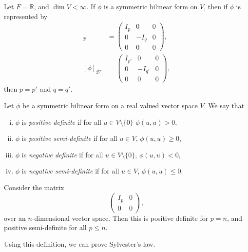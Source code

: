 \documentclass[12pt]{article}
\begin{document}
\begin{theorem}
	Let $F = \mathbb{R}$, and $\dim V < \infty$. If $\phi$ is a symmetric bilinear form on $V$, then if $\phi$ is represented by
	\begin{align*}
		[\phi]_{\mathcal{B}} &= 
		\begin{pmatrix}
			I_p & 0 & 0 \\
			   0 & -I_q & 0 \\
			0 & 0 & 0
		\end{pmatrix}
		, \\
		[\phi]_{\mathcal{B}'} &=
		\begin{pmatrix}
			I_{p'} & 0 & 0 \\
			      0 & -I_{q'} & 0 \\
			0 & 0 & 0
		\end{pmatrix},
	\end{align*}
	then $p = p'$ and $q = q'$.
\end{theorem}

\begin{definition}
	Let $\phi$ be a symmetric bilinear form on a real valued vector space $V$. We say that
	\begin{enumerate}[(i)]
		\item $\phi$ is \textit{positive definite} if for all $u \in V \setminus \{0\}$ $\phi(u, u) > 0$,
		\item $\phi$ is \textit{positive semi-definite} if for all $u \in V$, $\phi(u, u) \geq 0$,
		\item $\phi$ is \textit{negative definite} if for all $u \in V \setminus \{0\}$, $\phi(u, u) < 0$,
		\item $\phi$ is \textit{negative semi-definite} if for all $u \in V$, $\phi(u, u) \leq 0$.
	\end{enumerate}
\end{definition}

\begin{exbox}
	Consider the matrix
	\[
	\begin{pmatrix}
		I_p & 0 \\
		0 & 0
	\end{pmatrix}
	,\]
	over an $n$-dimensional vector space. Then this is positive definite for $p = n$, and positive semi-definite for all $p \leq n$.
\end{exbox}

Using this definition, we can prove Sylvester's law.
\end{document}
